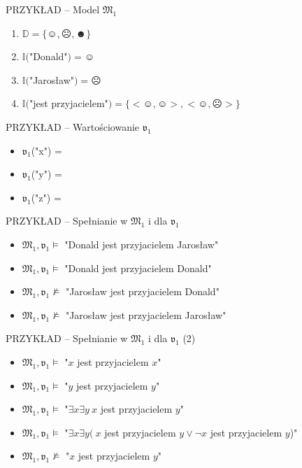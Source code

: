 \documentclass{beamer}
\begin{document}
\begin{frame}{PRZYKŁAD -- Model $\mathfrak{M}_1$}
%
\begin{enumerate}
    \item $\mathbb{D} = \{\smiley{}, \frownie{}, \blacksmiley{} \}$%
    \item $\mathbb{I}($"Donald"$)=\smiley{}$%
    \item $\mathbb{I}($"Jarosław"$)=\frownie{}$%
    \item $\mathbb{I}($"jest przyjacielem"$)=\{<\smiley{}, \smiley{}>, <\smiley{}, \frownie{}> \}$
\end{enumerate}
\end{frame}

\begin{frame}{PRZYKŁAD -- Wartościowanie $\mathfrak{v}_1$}
%
\begin{itemize}
\item $\mathfrak{v}_1$("x") = \smiley{}
\item $\mathfrak{v}_1$("y") = \smiley{}
\item $\mathfrak{v}_1$("z") = \smiley{}
\end{itemize}
\end{frame}

\begin{frame}{PRZYKŁAD -- Spełnianie w $\mathfrak{M}_1$ i dla $\mathfrak{v}_1$}
%
\begin{itemize}
\item $\mathfrak{M}_1,\mathfrak{v}_1 \vDash$ "Donald jest przyjacielem Jarosław"%
\item $\mathfrak{M}_1,\mathfrak{v}_1 \vDash$ "Donald jest przyjacielem Donald"%
\item $\mathfrak{M}_1,\mathfrak{v}_1 \not \vDash$ "Jarosław jest przyjacielem Donald"%
\item $\mathfrak{M}_1,\mathfrak{v}_1 \not \vDash$ "Jarosław jest przyjacielem Jarosław"
\end{itemize}
\end{frame}

\begin{frame}{PRZYKŁAD -- Spełnianie w $\mathfrak{M}_1$ i dla $\mathfrak{v}_1$ (2)}
%
\begin{itemize}
\item $\mathfrak{M}_1,\mathfrak{v}_1 \vDash$ "$x$ jest przyjacielem $x$"%
\item $\mathfrak{M}_1,\mathfrak{v}_1 \vDash$ "$y$ jest przyjacielem $y$"%
\item $\mathfrak{M}_1,\mathfrak{v}_1 \vDash$ "$\exists x \exists y ~x$ jest przyjacielem $y$"%
\item $\mathfrak{M}_1,\mathfrak{v}_1 \vDash$ "$\exists x \exists y ( ~x$ jest przyjacielem $y \lor \neg x$ jest przyjacielem $y$)"%
\item $\mathfrak{M}_1,\mathfrak{v}_1 \not \vDash$ "$x$ jest przyjacielem $y$"
\end{itemize}
\end{frame}
\end{document}
